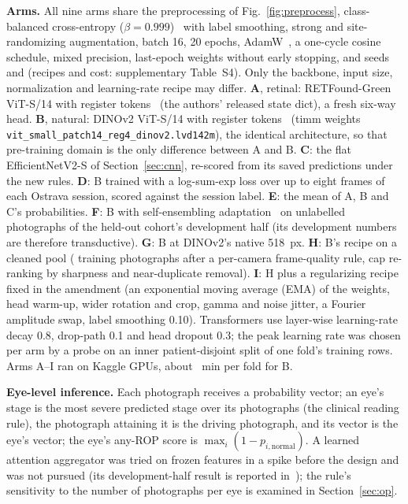 \documentclass[journal]{IEEEtran}
\begin{document}
\textbf{Arms.} All nine arms share the preprocessing of Fig.~\ref{fig:preprocess}, class-balanced cross-entropy ($\beta=0.999$)~\cite{cui2019} with label smoothing, strong and site-randomizing augmentation, batch 16, 20 epochs, AdamW~\cite{loshchilov2019}, a one-cycle cosine schedule, mixed precision, last-epoch weights without early stopping, and seeds \seedA{} and \seedB{} (recipes and cost: supplementary Table~S4). Only the backbone, input size, normalization and learning-rate recipe may differ. \textbf{A}, retinal: RETFound-Green ViT-S/14 with register tokens~\cite{engelmann2025} (the authors' released state dict), a fresh six-way head. \textbf{B}, natural: DINOv2 ViT-S/14 with register tokens~\cite{oquab2024,dosovitskiy2021} (timm weights \texttt{vit\_small\_patch14\_reg4\_dinov2.lvd142m}), the identical architecture, so that pre-training domain is the only difference between A and B. \textbf{C}: the flat EfficientNetV2-S of Section~\ref{sec:cnn}, re-scored from its saved predictions under the new rules. \textbf{D}: B trained with a log-sum-exp loss over up to eight frames of each Ostrava session, scored against the session label. \textbf{E}: the mean of A, B and C's probabilities. \textbf{F}: B with self-ensembling adaptation~\cite{french2018} on unlabelled photographs of the held-out cohort's development half (its development numbers are therefore transductive). \textbf{G}: B at DINOv2's native 518~px. \textbf{H}: B's recipe on a cleaned pool (\vfourTrain{} training photographs after a per-camera frame-quality rule, cap re-ranking by sharpness and near-duplicate removal). \textbf{I}: H plus a regularizing recipe fixed in the amendment (an exponential moving average (EMA) of the weights, head warm-up, wider rotation and crop, gamma and noise jitter, a Fourier amplitude swap, label smoothing 0.10). Transformers use layer-wise learning-rate decay 0.8, drop-path 0.1 and head dropout 0.3; the peak learning rate was chosen per arm by a probe on an inner patient-disjoint split of one fold's training rows. Arms A--I ran on Kaggle \gpu{} GPUs, about \BfoldMinutes{}~min per fold for B.

\textbf{Eye-level inference.} Each photograph receives a probability vector; an eye's stage is the most severe predicted stage over its photographs (the clinical reading rule), the photograph attaining it is the driving photograph, and its vector is the eye's vector; the eye's any-ROP score is $\max_i(1-p_{i,\mathrm{normal}})$. A learned attention aggregator was tried on frozen features in a spike before the design and was not pursued (its development-half result is reported in~\cite{nagpure2026}); the rule's sensitivity to the number of photographs per eye is examined in Section~\ref{sec:op}.
\end{document}
